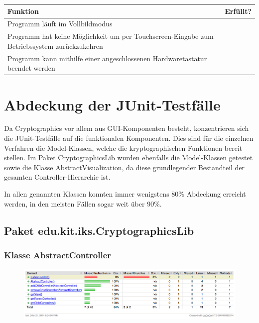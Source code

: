 \documentclass{article}
\newcommand{\cmark}{\ding{51}}
\begin{document}
    \begin{table}[H]
      \begin{tabularx}{\textwidth}{| >{\raggedright\arraybackslash}X | c |}
        \hline
        \textbf{Funktion} & \textbf{Erfüllt?} \\
        \hline
        Programm läuft im Vollbildmodus & \cmark \\
        \hline
        Programm hat keine Möglichkeit um per Touchscreen-Eingabe zum Betriebssystem zurückzukehren & \cmark \\
        \hline
        Programm kann mithilfe einer angeschlossenen Hardwaretastatur beendet werden & \cmark \\
        \hline
      \end{tabularx}
    \end{table}
\clearpage


\section{Abdeckung der JUnit-Testfälle}
  Da Cryptographics vor allem aus GUI-Komponenten besteht, konzentrieren sich die JUnit-Testfälle auf die
  funktionalen Komponenten. Dies sind für die einzelnen Verfahren die Model-Klassen, welche die kryptographischen
  Funktionen bereit stellen. Im Paket CryptographicsLib wurden ebenfalls die Model-Klassen getestet sowie die Klasse
  AbstractVisualization, da diese grundlegender Bestandteil der gesamten Controller-Hierarchie ist.

  In allen genannten Klassen konnten immer wenigstens 80\% Abdeckung erreicht werden, in den meisten Fällen sogar
  weit über 90\%.

  \subsection{Paket edu.kit.iks.CryptographicsLib}
    \subsubsection{Klasse AbstractController}
      \begin{figure}[H]
        \centering
          \includegraphics[width=\textwidth]{resources/coverage_lib_abstractcontroller}
      \end{figure}
\end{document}
